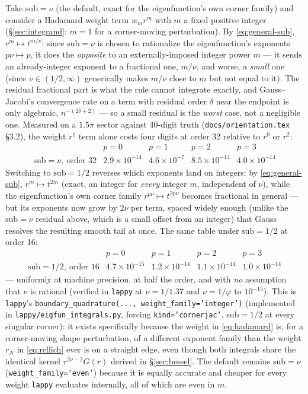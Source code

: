 \documentclass[11pt]{article}
\theoremstyle{remark}
\newcommand{\code}[1]{\texttt{#1}}
\begin{document}
Take $\mathrm{sub}=\nu$ (the default, exact for the eigenfunction's own corner family) and
consider a Hadamard weight term $w_m r^m$ with $m$ a fixed positive integer (\S\ref{sec:integrand}:
$m=1$ for a corner-moving perturbation). By \eqref{eq:general-sub}, $r^m\mapsto t^{m/\nu}$: since
$\mathrm{sub}=\nu$ is chosen to rationalize the eigenfunction's exponents $p\nu\mapsto p$, it does
the \emph{opposite} to an externally-imposed integer power $m$ --- it sends an already-integer
exponent to a fractional one, $m/\nu$, and worse, a \emph{small} one (since $\nu\in(1/2,\infty)$
generically makes $m/\nu$ close to $m$ but not equal to it). The residual fractional part is
what the rule cannot integrate exactly, and Gauss--Jacobi's convergence rate on a term with
residual order $\delta$ near the endpoint is only algebraic, $n^{-(2\delta+2)}$ — so a small
residual is the \emph{worst} case, not a negligible one. Measured on a $1.5\pi$ sector against
40-digit truth (\code{docs/orientation.tex} \S3.2), the weight $r^1$ term alone costs four digits
at order 32 relative to $r^0$ or $r^2$:
\[
\begin{array}{lcccc}
 & p=0 & p=1 & p=2 & p=3\\ \hline
\mathrm{sub}=\nu,\ \text{order }32 & 2.9\times10^{-14} & 4.6\times10^{-7} & 8.5\times10^{-14} & 4.0\times10^{-14}
\end{array}
\]
Switching to $\mathrm{sub}=1/2$ reverses which exponents land on integers: by
\eqref{eq:general-sub}, $r^m\mapsto t^{2m}$ (exact, an integer for \emph{every} integer $m$,
independent of $\nu$), while the eigenfunction's own corner family $r^{p\nu}\mapsto t^{2p\nu}$
becomes fractional in general --- but its exponents now grow by $2\nu$ per term, spaced widely
enough (unlike the $\mathrm{sub}=\nu$ residual above, which is a small offset from an integer)
that Gauss resolves the resulting smooth tail at once. The same table under $\mathrm{sub}=1/2$
at order 16:
\[
\begin{array}{lcccc}
 & p=0 & p=1 & p=2 & p=3\\ \hline
\mathrm{sub}=1/2,\ \text{order }16 & 4.7\times10^{-15} & 1.2\times10^{-14} & 1.1\times10^{-14} & 1.0\times10^{-14}
\end{array}
\]
--- uniformly at machine precision, at half the order, and with \emph{no} assumption that $\nu$ is
rational (verified in \code{lappy} at $\nu=1/1.37$ and $\nu=1/\varphi$ to $10^{-15}$). This is
\code{lappy}'s \code{boundary\_quadrature(..., weight\_family='integer')} (implemented in
\code{lappy/eigfun\_integrals.py}, forcing \code{kind='cornerjac'}, $\mathrm{sub}=1/2$ at every
singular corner): it exists specifically because the weight in \eqref{eq:hadamard} is, for a
corner-moving shape perturbation, of a different exponent family than the weight $r_N$ in
\eqref{eq:rellich} ever is on a straight edge, even though both integrals share the identical
kernel $r^{2\nu-2}G(r)$ derived in \S\ref{sec:bessel}. The default remains
$\mathrm{sub}=\nu$ (\code{weight\_family='even'}) because it is equally accurate and cheaper for
every weight \code{lappy} evaluates internally, all of which are even in $m$.
\end{document}
